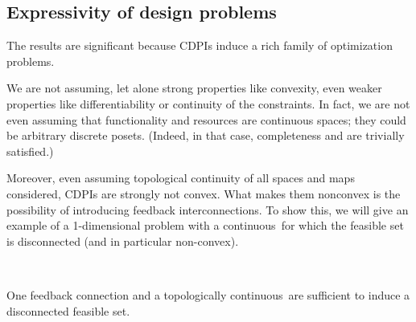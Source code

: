 \subsection{Expressivity of design problems}

The results are significant because CDPIs induce a rich family of optimization problems.

We are not assuming, let alone strong properties like convexity, even weaker properties like differentiability or continuity of the constraints.
In fact, we are not even assuming that functionality and resources are continuous spaces; they could be arbitrary discrete posets.
(Indeed, in that case, completeness and \scottcontinuity are trivially satisfied.)

Moreover, even assuming topological continuity of all spaces and maps considered, CDPIs are strongly not convex.
What makes them nonconvex is the possibility of introducing feedback interconnections.
To show this, we will give an example of a 1-dimensional problem with a continuous~\ftor for which the feasible set is disconnected (and in particular non-convex).
\begin{marginfigure}
    \centering
     \\
    \caption{One feedback connection and a topologically continuous~\ftor are sufficient to induce a disconnected feasible set.}
    \label{fig:ceil-1}
\end{marginfigure}

